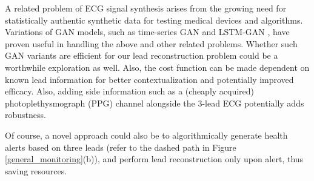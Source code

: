 \documentclass[conference]{IEEEtran}
\begin{document}

A related problem of ECG signal synthesis arises from the growing need for statistically authentic synthetic data for testing medical devices and algorithms. Variations of GAN models, such as time-series GAN and LSTM-GAN \cite{gantimeseries, lstmgan}, have proven useful in handling the above  and other related problems. Whether such GAN variants are efficient for our lead reconstruction problem could be a worthwhile exploration as well. Also, the cost function can be made dependent on known lead information for better contextualization and potentially improved efficacy. Also, adding side information such as a (cheaply acquired) photoplethysmograph (PPG) channel alongside the 3-lead ECG potentially adds robustness. 

Of course, a novel approach could also be to algorithmically generate health alerts based on three leads (refer to the dashed path in Figure \ref{general_monitoring}(b)), and perform lead reconstruction only upon alert, thus saving resources.






\end{document}
